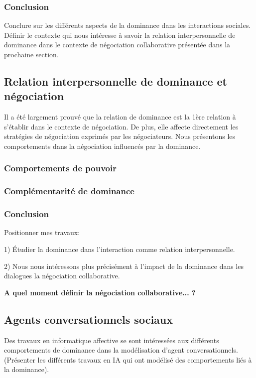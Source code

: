 \documentclass [french]{article}
\begin{document}
			\subsubsection{Conclusion} 
				Conclure sur les différents aspects de la dominance dans les interactions sociales.
				Définir le contexte qui nous intéresse à savoir la relation interpersonnelle de dominance dans le contexte de négociation collaborative présentée dans la prochaine section. 
		\subsection{Relation interpersonnelle de dominance et négociation}
			Il a été largement prouvé que la relation de dominance est la 1ère relation à s'établir dans le contexte de négociation. De  plus, elle  affecte directement les stratégies de négociation exprimés par les négociateurs. Nous présentons les comportements dans la négociation influencés par la dominance.
			
			\subsubsection{Comportements de pouvoir}
			
			\subsubsection{Complémentarité de dominance} 
				
			\subsubsection{Conclusion} Positionner mes travaux:
			
			 1) Étudier la dominance dans l'interaction comme relation interpersonnelle. 
			
			2) Nous nous intéressons plus précisément à l'impact de la dominance dans les dialogues la négociation collaborative.
				 
				 \textbf{A quel moment définir la négociation collaborative... ?} 
				
				
		\subsection{Agents conversationnels sociaux}
			Des travaux en informatique affective se sont intéressées aux différents comportements de dominance dans la modélisation d'agent conversationnels.
			(Présenter les différents travaux en IA qui ont modélisé des comportements liés à la dominance).
			
\end{document}
